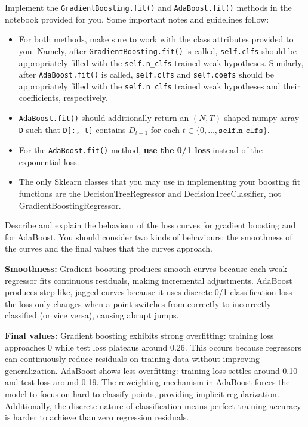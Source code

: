 \documentclass{article}
\begin{document}
\begin{problem}[14]
    Implement the \texttt{GradientBoosting.fit()} and \texttt{AdaBoost.fit()} methods in the notebook provided for you. Some important notes and guidelines follow:
    \begin{itemize}
        \item For both methods, make sure to work with the class attributes provided to you. Namely, after \texttt{GradientBoosting.fit()} is called, \texttt{self.clfs} should be appropriately filled with the \texttt{self.n_clfs} trained weak hypotheses. Similarly, after \texttt{AdaBoost.fit()} is called, \texttt{self.clfs} and \texttt{self.coefs} should be appropriately filled with the \texttt{self.n_clfs} trained weak hypotheses and their coefficients, respectively.
        \item \texttt{AdaBoost.fit()} should additionally return an $(N, T)$ shaped numpy array \texttt{D} such that \texttt{D[:, t]} contains $D_{t+1}$ for each $t \in \{0, \ldots, \texttt{self.n_clfs}\}$.
        \item For the \texttt{AdaBoost.fit()} method, \textbf{use the 0/1 loss} instead of the exponential loss.
	\item The only Sklearn classes that you may use in implementing your boosting fit functions are the DecisionTreeRegressor and DecisionTreeClassifier, not GradientBoostingRegressor.
    \end{itemize}
\end{problem}

\begin{problem}[2]
    Describe and explain the behaviour of the loss curves for gradient boosting and for AdaBoost. You should consider two kinds of behaviours: the smoothness of the curves and the final values that the curves approach.
\end{problem}
\begin{solution}
\textbf{Smoothness:} Gradient boosting produces smooth curves because each weak regressor fits continuous residuals, making incremental adjustments. AdaBoost produces step-like, jagged curves because it uses discrete 0/1 classification loss---the loss only changes when a point switches from correctly to incorrectly classified (or vice versa), causing abrupt jumps.

\textbf{Final values:} Gradient boosting exhibits strong overfitting: training loss approaches 0 while test loss plateaus around 0.26. This occurs because regressors can continuously reduce residuals on training data without improving generalization. AdaBoost shows less overfitting: training loss settles around 0.10 and test loss around 0.19. The reweighting mechanism in AdaBoost forces the model to focus on hard-to-classify points, providing implicit regularization. Additionally, the discrete nature of classification means perfect training accuracy is harder to achieve than zero regression residuals.

\end{solution}
\end{document}
